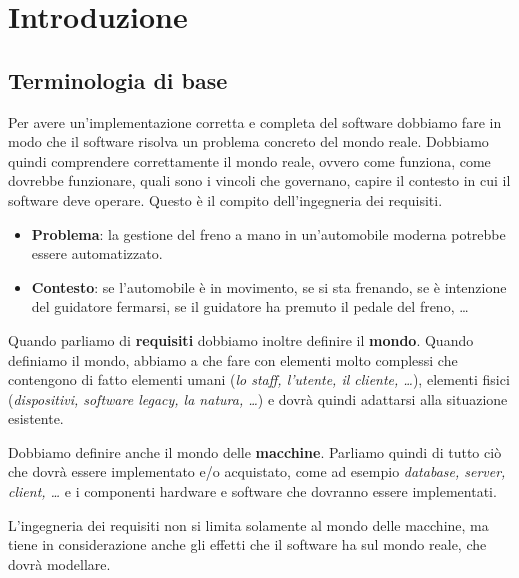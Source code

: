 \chapter{Introduzione}
\section{Terminologia di base}
Per avere un'implementazione corretta e completa del software dobbiamo fare 
in modo che il software risolva un problema concreto del mondo reale. Dobbiamo quindi 
comprendere correttamente il mondo reale, ovvero come funziona, come dovrebbe 
funzionare, quali sono i vincoli che governano, capire il contesto in cui il
software deve operare. Questo è il compito dell'ingegneria dei requisiti.

\begin{tcolorbox}[title=Esempio: il controllo di un'automobile]
\begin{itemize}
    \item \textbf{Problema}: la gestione del freno a mano in un'automobile 
    moderna potrebbe essere automatizzato.
    \item \textbf{Contesto}: se l'automobile è in movimento, 
    se si sta frenando, se è intenzione del guidatore fermarsi,
    se il guidatore ha premuto il pedale del freno, \dots
\end{itemize}
\end{tcolorbox}
Quando parliamo di \textbf{requisiti} dobbiamo inoltre definire il 
\textbf{mondo}. Quando definiamo il mondo, abbiamo a che fare con elementi molto 
complessi che contengono di fatto elementi umani (\textit{lo staff, 
l'utente, il cliente, \dots}), elementi fisici (\textit{dispositivi, 
software legacy, la natura, \dots}) e dovrà quindi adattarsi alla situazione 
esistente.

Dobbiamo definire anche il mondo delle \textbf{macchine}. Parliamo 
quindi di tutto ciò che dovrà essere implementato e/o acquistato, come ad esempio
\textit{database, server, client, \dots} e i componenti 
hardware e software che dovranno essere implementati.

L'ingegneria dei requisiti non si limita solamente al mondo delle 
macchine, ma tiene in considerazione anche gli effetti che il 
software ha sul mondo reale, che dovrà modellare. 

